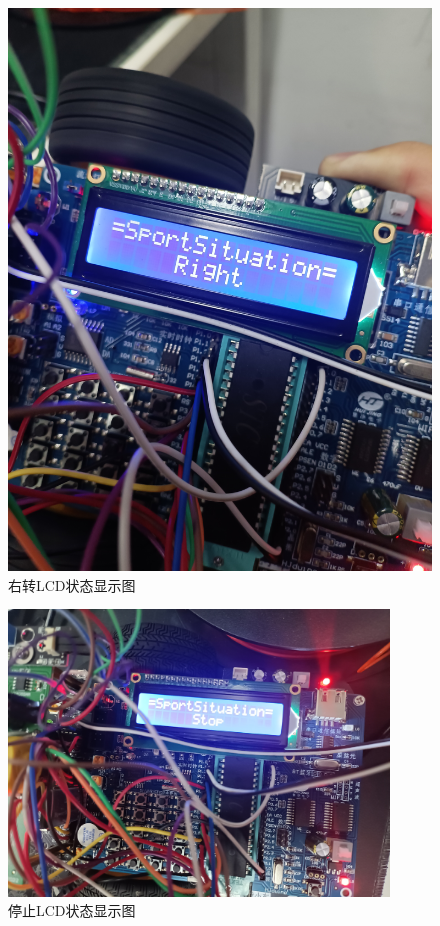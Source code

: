 \begin{figure}[htbp]
\begin{minipage}{0.49\linewidth}
		\includegraphics[width=0.9\linewidth]{figures/right.jpg}
		\caption{右转LCD状态显示图}
		\label{right}%
	\end{minipage}
\end{figure}
\begin{figure}[!htbp]
    \centering
    \includegraphics[width =0.9\textwidth]{figures/stop.jpg}
    \caption{停止LCD状态显示图}
    \label{stop}
\end{figure}

